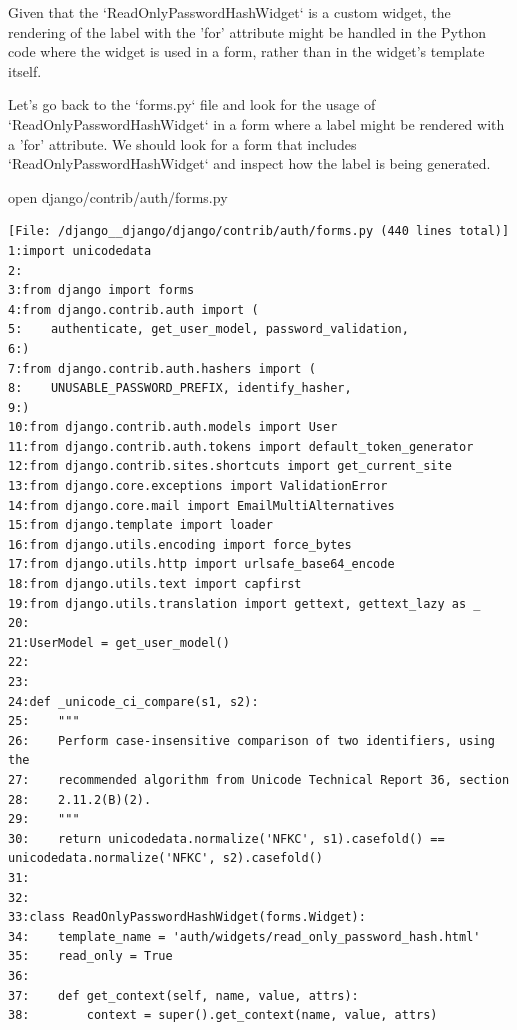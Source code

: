 {\begin{agentbox}
Given that the `ReadOnlyPasswordHashWidget` is a custom widget, the rendering of the label with the 'for' attribute might be handled in the Python code where the widget is used in a form, rather than in the widget's template itself.



Let's go back to the `forms.py` file and look for the usage of `ReadOnlyPasswordHashWidget` in a form where a label might be rendered with a 'for' attribute. We should look for a form that includes `ReadOnlyPasswordHashWidget` and inspect how the label is being generated.



\hrulefill
\begin{CodeVerbatim}[breaklines=true, breakanywhere=true]
open django/contrib/auth/forms.py
\end{CodeVerbatim}
\end{agentbox}
\begin{observationbox}\begin{Verbatim}[breaklines=true, breakanywhere=true]
[File: /django__django/django/contrib/auth/forms.py (440 lines total)]
1:import unicodedata
2:
3:from django import forms
4:from django.contrib.auth import (
5:    authenticate, get_user_model, password_validation,
6:)
7:from django.contrib.auth.hashers import (
8:    UNUSABLE_PASSWORD_PREFIX, identify_hasher,
9:)
10:from django.contrib.auth.models import User
11:from django.contrib.auth.tokens import default_token_generator
12:from django.contrib.sites.shortcuts import get_current_site
13:from django.core.exceptions import ValidationError
14:from django.core.mail import EmailMultiAlternatives
15:from django.template import loader
16:from django.utils.encoding import force_bytes
17:from django.utils.http import urlsafe_base64_encode
18:from django.utils.text import capfirst
19:from django.utils.translation import gettext, gettext_lazy as _
20:
21:UserModel = get_user_model()
22:
23:
24:def _unicode_ci_compare(s1, s2):
25:    """
26:    Perform case-insensitive comparison of two identifiers, using the
27:    recommended algorithm from Unicode Technical Report 36, section
28:    2.11.2(B)(2).
29:    """
30:    return unicodedata.normalize('NFKC', s1).casefold() == unicodedata.normalize('NFKC', s2).casefold()
31:
32:
33:class ReadOnlyPasswordHashWidget(forms.Widget):
34:    template_name = 'auth/widgets/read_only_password_hash.html'
35:    read_only = True
36:
37:    def get_context(self, name, value, attrs):
38:        context = super().get_context(name, value, attrs)

\end{Verbatim}
\end{observationbox}}
